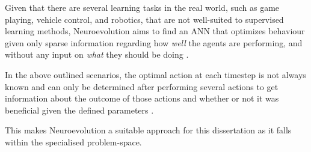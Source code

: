Given that there are several learning tasks in the real world, such as game playing, vehicle control, and robotics, that are not well-suited to supervised learning methods, Neuroevolution aims to find an ANN that optimizes behaviour given only sparse information regarding how \textit{well} the agents are performing, and without any input on \textit{what} they should be doing \cite{Miikkulainen2010}. 

In the above outlined scenarios, the optimal action at each timestep is not always known and can only be determined after performing several actions to get information about the outcome of those actions and whether or not it was beneficial given the defined parameters \cite{Miikkulainen2010}.

This makes Neuroevolution a suitable approach for this dissertation as it falls within the specialised problem-space.


